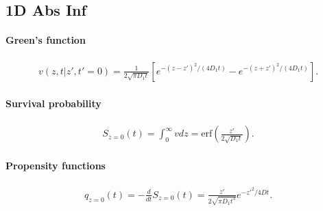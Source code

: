
\subsection{1D Abs Inf}

\paragraph{Green's function}
\begin{align}
  v(z,t|z',t'=0) = \frac{1}{2\sqrt{\pi D_1t}}
  [ e^{-(z-z')^2/(4 D_1 t)} - e^{-(z+z')^2/(4 D_1 t)} ].
\end{align}

\paragraph{Survival probability}
\begin{align}
  S_{z=0}(t) = \int_0^\infty v dz =
  \text{erf}(\frac{z'}{2\sqrt{D_1 t}}).
\end{align}

\paragraph{Propensity functions}
\begin{align}
  q_{z=0}(t) = -\frac{d}{dt} S_{z=0}(t)=
  \frac{z'}{2\sqrt{\pi D_1 t^3}} e^{-z'^2/4Dt}.
\end{align}

